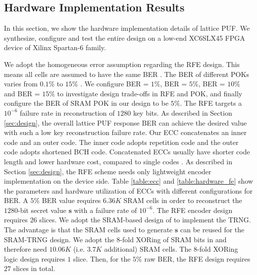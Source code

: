 \subsection{Hardware Implementation Results}
\label{sec:hardware_results}

In this section, we show the hardware implementation details of lattice PUF. We synthesize, configure and test the entire design on a low-end XC6SLX45 FPGA device of Xilinx Spartan-6 family.  

We adopt the homogeneous error assumption regarding the RFE design. This means all cells are assumed to have the same BER \cite{bosch2008efficient}.
The BER of different POKs varies from $0.1\%$ \cite{karpinskyy20168} to $15\%$ \cite{maes2009soft}.
We configure BER = $1\%$, BER = $5\%$, BER = $10\%$ and BER = $15\%$ to investigate design trade-offs in RFE and POK, and finally configure the BER of SRAM POK in our design to be $5\%$. The RFE targets a $10^{-6}$ failure rate in reconstruction of $1280$ key bits. 
As described in Section \ref{sec:design}, the overall lattice PUF response BER can achieve the desired value with such a low key reconstruction failure rate.
Our ECC concatenates an inner code and an outer code. The inner code adopts repetition code and the outer code adopts shortened BCH code. Concatenated ECCs usually have shorter code length and lower hardware cost, compared to single codes \cite{bosch2008efficient}.
As described in Section \ref{sec:design}, the RFE scheme needs only lightweight encoder implementation on the device side. 
Table \ref{table:ecc} and \ref{table:hardware_fe} show the parameters and hardware utilization of ECCs with different configurations for BER.
A $5\%$ BER value requires $6.36K$ SRAM cells in order to reconstruct the $1280$-bit secret value $\mathbf{s}$ with a failure rate of $10^{-6}$.
The RFE encoder design requires $26$ slices. 
We adopt the SRAM-based design of \cite{aysu2015end} to implement the TRNG. The advantage is that the SRAM cells used to generate $\mathbf{s}$ can be reused for the SRAM-TRNG design. 
We adopt the 8-fold XORing of SRAM bits in \cite{aysu2015end} and therefore need $10.06K$ (i.e. $3.7K$ additional) SRAM cells. 
The 8-fold XORing logic design requires $1$ slice. 
Then, for the $5\%$ raw BER, the RFE design requires $27$ slices in total. 


